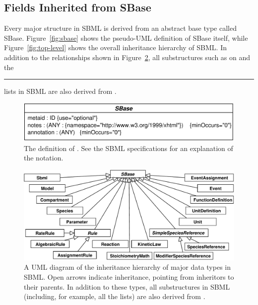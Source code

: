 \documentclass{sbmlmanual}
\begin{document}



\subsection{Fields Inherited from SBase}
\label{sec:inherited-from-sbase}

Every major structure in SBML is derived from an abstract base type called
SBase.  Figure~\vref{fig:sbase} shows the pseudo-UML definition of SBase
itself, while Figure~\vref{fig:top-level} shows the overall inheritance
hierarchy of SBML.  In addition to the relationships shown in
Figure~\ref{fig:top-level}, all substructures such as  on
 and the \rule{0.5in}{0.5pt} lists in SBML are
also derived from .

\begin{figure}[hbt]
  \centering
  \includegraphics[scale = 0.7]{sbase}
  \caption{The definition of .  See the SBML specifications
  for an explanation of the notation.}
  \label{fig:sbase}
\end{figure}


\begin{figure}[hbt]
  \centering
  \includegraphics[scale = 0.7]{top-level}
  \caption{A UML diagram of the inheritance hierarchy of major data types
    in SBML.  Open arrows indicate inheritance, pointing from inheritors to
    their parents.  In addition to these types, all substructures in SBML
    (including, for example, all the  lists) are also derived
    from .}
  \label{fig:top-level}
\end{figure}
\end{document}
